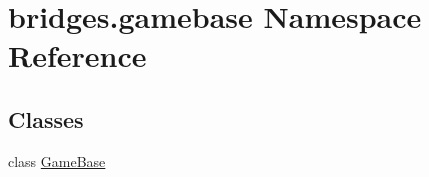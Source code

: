 \hypertarget{namespacebridges_1_1gamebase}{}\section{bridges.\+gamebase Namespace Reference}
\label{namespacebridges_1_1gamebase}
\subsection*{Classes}
\begin{DoxyCompactItemize}
\item 
class \hyperlink{classbridges_1_1gamebase_1_1_game_base}{Game\+Base}
\end{DoxyCompactItemize}
